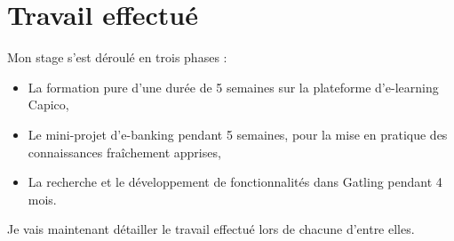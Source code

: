\chapter{Travail effectué}

Mon stage s'est déroulé en trois phases :

\begin{itemize}
	\item La formation pure d'une durée de 5 semaines sur la plateforme d'e-learning Capico,
	\item Le mini-projet d'e-banking pendant 5 semaines, pour la mise en pratique des connaissances fraîchement apprises,
	\item La recherche et le développement de fonctionnalités dans Gatling pendant 4 mois.\\
\end{itemize}

Je vais maintenant détailler le travail effectué lors de chacune d'entre elles.





